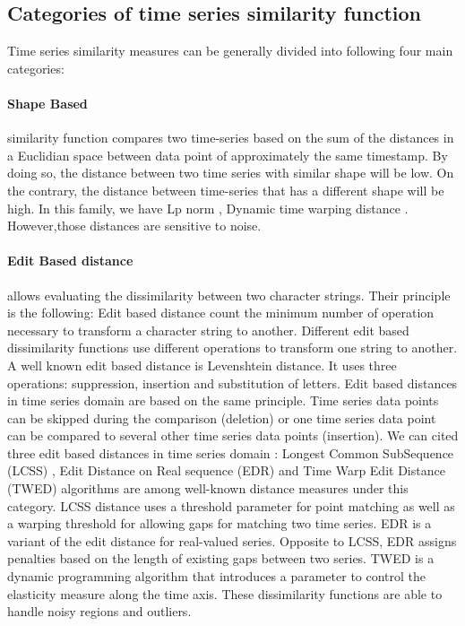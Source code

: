 \subsection{Categories of time series similarity function}


Time series similarity measures can be generally divided into following four main categories:


\paragraph{Shape Based} similarity function compares two time-series based on the sum of the distances in a Euclidian space between data point of approximately the same timestamp. By doing so, the distance between two time series with similar shape will be low. On the contrary, the distance between time-series that has a different shape will be high. In this family, we have Lp norm \cite{yi2000fast} \cite{keogh2003need}, Dynamic time warping distance \cite{ MyersRabinerRosenberg1980}. However,those distances are sensitive to noise.

\paragraph{Edit Based distance} allows evaluating the dissimilarity between two character strings. Their principle is the following: Edit based distance count the minimum number of operation necessary to transform a character string to another. Different edit based dissimilarity functions use different operations to transform one string to another. A well known edit based distance is Levenshtein distance. It uses three operations: suppression, insertion and substitution of letters. Edit based distances in time series domain are based on the same principle. Time series data points can be skipped during the comparison (deletion) or one time series data point can be compared to several other time series data points (insertion). We can cited three edit based distances in time series domain : Longest Common SubSequence (LCSS) \cite{das1997finding}, Edit Distance on Real sequence (EDR) \cite{chen2005robust} and Time Warp Edit Distance (TWED) \cite{marteau2009time} algorithms are among well-known distance measures under this category. LCSS distance uses a threshold parameter for point matching as well as a warping threshold for allowing gaps for matching two time series. EDR is a variant of the edit distance for real-valued series. Opposite to LCSS, EDR assigns penalties based on the length of existing gaps between two series. TWED is a dynamic programming algorithm that introduces a parameter to control the elasticity measure along the time axis. These dissimilarity functions are able to handle noisy regions and outliers.

